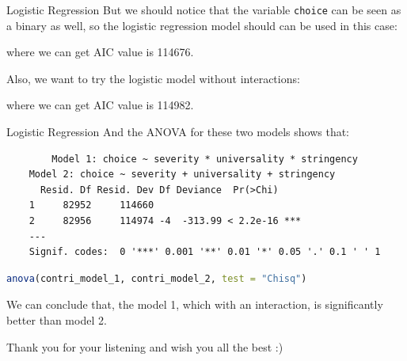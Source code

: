 \documentclass{beamer}
\begin{document}
\begin{frame}{Logistic Regression}
\noindent But we should notice that the variable \texttt{choice} can be seen as a binary as well, so the logistic regression model should can be used in this case:

where we can get AIC value is 114676.
\par
\noindent Also, we want to try the logistic model without interactions:

where we can get AIC value is 114982.
\end{frame}

\begin{frame}[fragile]{Logistic Regression}
	And the ANOVA for these two models shows that:
	\begin{verbatim}
		Model 1: choice ~ severity * universality * stringency
	Model 2: choice ~ severity + universality + stringency
	  Resid. Df Resid. Dev Df Deviance  Pr(>Chi)    
	1     82952     114660                          
	2     82956     114974 -4  -313.99 < 2.2e-16 ***
	---
	Signif. codes:  0 '***' 0.001 '**' 0.01 '*' 0.05 '.' 0.1 ' ' 1
	\end{verbatim}
\begin{lstlisting}[language=R, basicstyle=\footnotesize]
anova(contri_model_1, contri_model_2, test = "Chisq")
\end{lstlisting}
We can conclude that, the model 1, which with an interaction, is significantly better than model 2.
\end{frame}

\begin{frame}


\end{frame}

\begin{frame}
	Thank you for your listening and wish you all the best :)
\end{frame}
\end{document}
